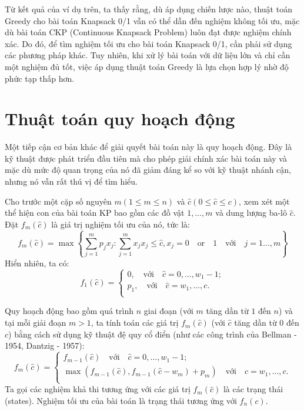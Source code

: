 Từ kết quả của ví dụ trên, ta thấy rằng, dù áp dụng chiến lược nào, thuật toán Greedy cho bài toán Knapsack 0/1 vẫn có thể dẫn đến nghiệm không tối ưu, mặc dù bài toán CKP (Continuous Knapsack Problem) luôn đạt được nghiệm chính xác. Do đó, để tìm nghiệm tối ưu cho bài toán Knapsack 0/1, cần phải sử dụng các phương pháp khác. Tuy nhiên, khi xử lý bài toán với dữ liệu lớn và chỉ cần một nghiệm đủ tốt, việc áp dụng thuật toán Greedy là lựa chọn hợp lý nhờ độ phức tạp thấp hơn.
\section{Thuật toán quy hoạch động}
Một tiếp cận cơ bản khác để giải quyết bài toán này là quy hoạch động. Đây là kỹ thuật được phát triển đầu tiên mà cho phép giải chính xác bài toán này và mặc dù mức độ quan trọng của nó đã giảm đáng kể so với kỹ thuật nhánh cận, nhưng nó vẫn rất thú vị để tìm hiểu.

Cho trước một cặp số nguyên $m (1 \leq m \leq n)$ và $\hat{c} (0 \leq \hat{c} \leq c)$, xem xét một thể hiện con của bài toán KP bao gồm các đồ vật $1, \dots, m$ và dung lượng ba-lô $\hat{c}$. Đặt $f_m(\hat{c})$ là giá trị nghiệm tối ưu của nó, tức là:
\begin{equation}
    \label{eq:2.29}
    f_m(\hat{c}) = \max\left\{\sum_{j=1}^mp_jx_j: \sum_{j=1}^mx_jx_j \leq \hat{c}, x_j = 0 \quad\text{or}\quad1\quad\text{với}\quad j = 1\dots, m\right\}
\end{equation}
Hiển nhiên, ta có:
\begin{equation}
    f_1(\hat{c}) = \begin{cases}
        0,\quad\text{với}\quad \hat{c} = 0, \dots, w_1 -1;\\
        p_1, \quad\text{với}\quad \hat{c} = w_1, \dots, c.\\
    \end{cases}
\end{equation}

Quy hoạch động bao gồm quá trình $n$ giai đoạn (với $m$ tăng dần từ $1$ đến $n$) và tại mỗi giải đoạn $m > 1$, ta tính toán các giá trị $f_m(\hat{c})$ (với $\hat{c}$ tăng dần từ $0$ đến $c$) bằng cách sử dụng kỹ thuật đệ quy cổ điển (như các công trình của Bellman - 1954, Dantzig - 1957):
\begin{equation*}
    f_m(\hat{c}) = \begin{cases}
        f_{m - 1}(\hat{c})\quad\text{với}\quad \hat{c} = 0, \dots, w_1 -1;\\
        \max(f_{m - 1}(\hat{c}), f_{m - 1}(\hat{c} - w_m) + p_m)\quad\text{với}\quad \hat{c} = w_1, \dots, c.\\
    \end{cases}
\end{equation*}
Ta gọi các nghiệm khả thi tương ứng với các giá trị $f_m(\hat{c})$ là các trạng thái (states). Nghiệm tối ưu của bài toán là trạng thái tương ứng với $f_n(c)$.

